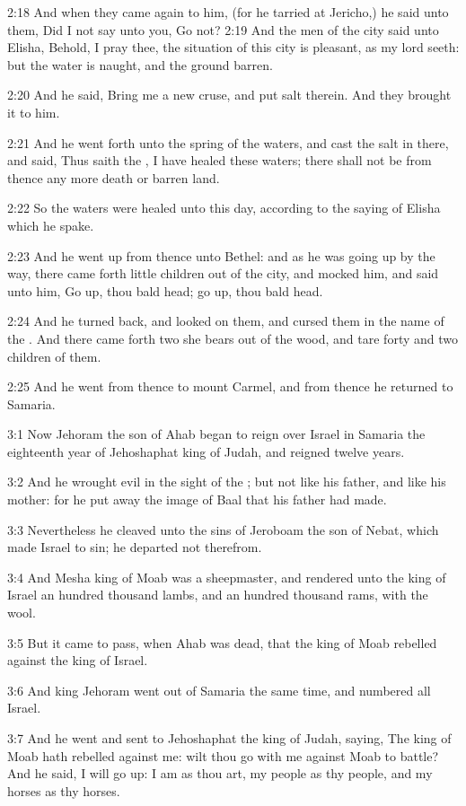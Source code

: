 2:18 And when they came again to him, (for he tarried at Jericho,) he
said unto them, Did I not say unto you, Go not?  2:19 And the men of
the city said unto Elisha, Behold, I pray thee, the situation of this
city is pleasant, as my lord seeth: but the water is naught, and the
ground barren.

2:20 And he said, Bring me a new cruse, and put salt therein. And they
brought it to him.

2:21 And he went forth unto the spring of the waters, and cast the
salt in there, and said, Thus saith the \LORD, I have healed these
waters; there shall not be from thence any more death or barren land.

2:22 So the waters were healed unto this day, according to the saying
of Elisha which he spake.

2:23 And he went up from thence unto Bethel: and as he was going up by
the way, there came forth little children out of the city, and mocked
him, and said unto him, Go up, thou bald head; go up, thou bald head.

2:24 And he turned back, and looked on them, and cursed them in the
name of the \LORD. And there came forth two she bears out of the wood,
and tare forty and two children of them.

2:25 And he went from thence to mount Carmel, and from thence he
returned to Samaria.

3:1 Now Jehoram the son of Ahab began to reign over Israel in Samaria
the eighteenth year of Jehoshaphat king of Judah, and reigned twelve
years.

3:2 And he wrought evil in the sight of the \LORD; but not like his
father, and like his mother: for he put away the image of Baal that
his father had made.

3:3 Nevertheless he cleaved unto the sins of Jeroboam the son of
Nebat, which made Israel to sin; he departed not therefrom.

3:4 And Mesha king of Moab was a sheepmaster, and rendered unto the
king of Israel an hundred thousand lambs, and an hundred thousand
rams, with the wool.

3:5 But it came to pass, when Ahab was dead, that the king of Moab
rebelled against the king of Israel.

3:6 And king Jehoram went out of Samaria the same time, and numbered
all Israel.

3:7 And he went and sent to Jehoshaphat the king of Judah, saying, The
king of Moab hath rebelled against me: wilt thou go with me against
Moab to battle? And he said, I will go up: I am as thou art, my people
as thy people, and my horses as thy horses.


